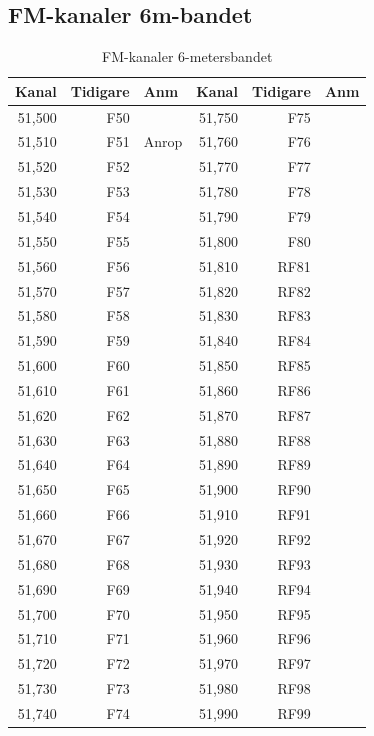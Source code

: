 {\subsection{FM-kanaler 6m-bandet}

\begin{longtable}{rrl|rrl}
\caption{FM-kanaler 6-metersbandet}\\
\textbf{Kanal} & \textbf{Tidigare} & \textbf{Anm}
&  \textbf{Kanal} & \textbf{Tidigare} & \textbf{Anm} \\ \hline
	51,500 &      F50 &       & 51,750 &      F75 &  \\
	51,510 &      F51 & Anrop & 51,760 &      F76 &  \\
	51,520 &      F52 &       & 51,770 &      F77 &  \\
	51,530 &      F53 &       & 51,780 &      F78 &  \\
	51,540 &      F54 &       & 51,790 &      F79 &  \\
	51,550 &      F55 &       & 51,800 &      F80 &  \\
	51,560 &      F56 &       & 51,810 &     RF81 &  \\
	51,570 &      F57 &       & 51,820 &     RF82 &  \\
	51,580 &      F58 &       & 51,830 &     RF83 &  \\
	51,590 &      F59 &       & 51,840 &     RF84 &  \\
	51,600 &      F60 &       & 51,850 &     RF85 &  \\
	51,610 &      F61 &       & 51,860 &     RF86 &  \\
	51,620 &      F62 &       & 51,870 &     RF87 &  \\
	51,630 &      F63 &       & 51,880 &     RF88 &  \\
	51,640 &      F64 &       & 51,890 &     RF89 &  \\
	51,650 &      F65 &       & 51,900 &     RF90 &  \\
	51,660 &      F66 &       & 51,910 &     RF91 &  \\
	51,670 &      F67 &       & 51,920 &     RF92 &  \\
	51,680 &      F68 &       & 51,930 &     RF93 &  \\
	51,690 &      F69 &       & 51,940 &     RF94 &  \\
	51,700 &      F70 &       & 51,950 &     RF95 &  \\
	51,710 &      F71 &       & 51,960 &     RF96 &  \\
	51,720 &      F72 &       & 51,970 &     RF97 &  \\
	51,730 &      F73 &       & 51,980 &     RF98 &  \\
	51,740 &      F74 &       & 51,990 &     RF99 &
\end{longtable}


}
